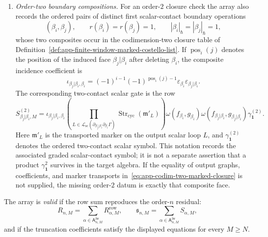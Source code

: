 \begin{defn}
\begin{enumerate}[label=(A\arabic*)]
    \item \emph{Order-two boundary compositions.}  For an order-\(2\)
    closure check the array also records the ordered pairs of distinct
    first scalar-contact boundary operations
    \[
      (\beta_i,\beta_j),\qquad
      r(\beta_i)=r(\beta_j)=1,\qquad
      |\beta_i|_\hbar=|\beta_j|_\hbar=1,
    \]
    whose two composites occur in the codimension-two closure table of
    Definition~\ref{def:app-finite-window-marked-costello-list}.  If
    \(\operatorname{pos}_i(j)\) denotes the position of the induced face
    \(\beta_j|\beta_i\) after deleting \(\beta_i\), the composite
    incidence coefficient is
    \[
      \iota_{\beta_j|\beta_i,\beta_i}
        =
      {(-1)}^{i-1}{(-1)}^{\operatorname{pos}_i(j)-1}
      \varepsilon_{\beta_i}\varepsilon_{\beta_j|\beta_i}.
    \]
    The corresponding two-contact scalar gate is the row
    \[
      S^{(2)}_{\beta_j|\beta_i,M}
        =
      \iota_{\beta_j|\beta_i,\beta_i}
      \left(
        \prod_{L\in\mathcal L_{\mathrm{sc}}
        (\partial_{\beta_j|\beta_i}\partial_{\beta_i}\Gamma)}
        \operatorname{Str}_{\mathrm{cyc}}(\mathfrak m'_L)
      \right)
      \omega(f_{\beta_i},g_{\beta_i})
      \omega(f_{\beta_j|\beta_i},g_{\beta_j|\beta_i})
      \gamma_{\mathbf 1}^{(2)}.
    \]
    Here \(\mathfrak m'_L\) is the transported marker on the output scalar
    loop \(L\), and \(\gamma_{\mathbf 1}^{(2)}\) denotes the ordered
    two-contact scalar symbol.  This notation records the associated
    graded scalar-contact symbol; it is not a separate assertion that a
    product \(\gamma_{\mathbf 1}^2\) survives in the target algebra.
    If the equality of output graphs, coefficients, and marker transports
    in~\eqref{eq:app-codim-two-marked-closure} is not supplied, the missing
    order-\(2\) datum is exactly that composite face.
  \end{enumerate}

  The array is \emph{valid} if the row sum reproduces the order-\(n\)
  residual:
  \[
    R_{n,M}
      =
    \sum_{\alpha\in\mathsf A^{\mathrm{fw}}_{n,M}}
      R_{\alpha,M}^{\mathrm{row}},
    \qquad
    \mathfrak s_{n,M}
      =
    \sum_{\alpha\in\mathsf A^{\mathrm{fw}}_{n,M}}S_{\alpha,M},
  \]
  and if the truncation coefficients satisfy the displayed equations for
  every \(M\geq N\).
\end{defn}

